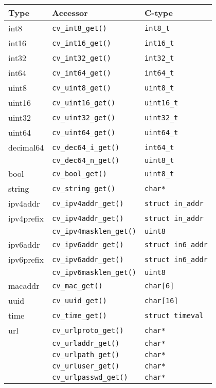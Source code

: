 \documentclass[a4paper, 10pt] {article}
\begin{document}
\begin{tabular}{ | l | l | l | }
\hline
  \textbf{ Type} & \textbf{Accessor} & \textbf{C-type}\\
\hline
int8   & {\tt cv\_int8\_get()}   & {\tt int8\_t} \\
int16  & {\tt cv\_int16\_get()}  & {\tt int16\_t} \\
int32  & {\tt cv\_int32\_get()}  & {\tt int32\_t} \\
int64  & {\tt cv\_int64\_get()}  & {\tt int64\_t} \\
uint8  & {\tt cv\_uint8\_get()}  & {\tt uint8\_t} \\
uint16 & {\tt cv\_uint16\_get()} & {\tt uint16\_t} \\
uint32 & {\tt cv\_uint32\_get()} & {\tt uint32\_t} \\
uint64 & {\tt cv\_uint64\_get()} & {\tt uint64\_t} \\
decimal64 & {\tt cv\_dec64\_i\_get()} & {\tt int64\_t}\\
           & {\tt cv\_dec64\_n\_get()} & {\tt uint8\_t}\\
bool & {\tt cv\_bool\_get()} & {\tt uint8\_t} \\
string & {\tt cv\_string\_get()} & {\tt char*} \\
ipv4addr   & {\tt cv\_ipv4addr\_get()} & {\tt struct in\_addr}\\
ipv4prefix & {\tt cv\_ipv4addr\_get()} & {\tt struct in\_addr}\\
           & {\tt cv\_ipv4masklen\_get()} & {\tt uint8}\\
ipv6addr   & {\tt cv\_ipv6addr\_get()} & {\tt struct in6\_addr}\\
ipv6prefix & {\tt cv\_ipv6addr\_get()} & {\tt struct in6\_addr}\\
           & {\tt cv\_ipv6masklen\_get()} & {\tt uint8}\\
macaddr    & {\tt cv\_mac\_get()} & {\tt char[6]}\\
uuid       & {\tt cv\_uuid\_get()} & {\tt char[16]}\\
time       & {\tt cv\_time\_get()} & {\tt struct timeval}\\
url        & {\tt cv\_urlproto\_get()} & {\tt char*}\\
           & {\tt cv\_urladdr\_get()} & {\tt char*}\\
           & {\tt cv\_urlpath\_get()} & {\tt char*}\\
           & {\tt cv\_urluser\_get()} & {\tt char*}\\
           & {\tt cv\_urlpasswd\_get()} & {\tt char*}\\
\hline
\end{tabular}
\end{document}
